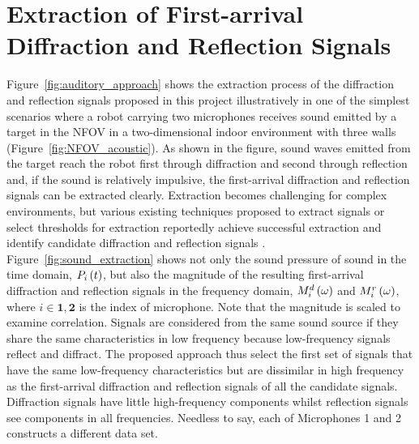 \documentclass[letterpaper, 10 pt, conference]{ieeeconf}  %
\begin{document}
\section{Extraction of First-arrival Diffraction and Reflection Signals} 
Figure~\ref{fig:auditory_approach} shows the extraction process of the diffraction and reflection signals proposed in this project illustratively in one of the simplest scenarios where a robot carrying two microphones receives sound emitted by a target in the NFOV in a two-dimensional indoor environment with three walls (Figure~\ref{fig:NFOV_acoustic}).  As shown in the figure, sound waves emitted from the target reach the robot first through diffraction and second through reflection and, if the sound is relatively impulsive, the first-arrival diffraction and reflection signals can be extracted clearly.  Extraction becomes challenging for complex environments, but various existing techniques proposed to extract signals or select thresholds for extraction reportedly achieve successful extraction and identify candidate diffraction and reflection signals \cite{lee2006large,irahhauten2006investigation,xu2008delay,Guvenc2009}.  Figure~\ref{fig:sound_extraction} shows not only the sound pressure of sound in the time domain, $P_i\left ( t \right )$, but also the magnitude of the resulting first-arrival diffraction and reflection signals in the frequency domain, $M_i^d\left ( \omega \right )$ and $M_i^r\left ( \omega \right )$, where $i \in \bm{1,2}$ is the index of microphone.  Note that the magnitude is scaled to examine correlation.  Signals are considered from the same sound source if they share the same characteristics in low frequency because low-frequency signals reflect and diffract.  The proposed approach thus select the first set of signals that have the same low-frequency characteristics but are dissimilar in high frequency as the first-arrival diffraction and reflection signals of all the candidate signals.  Diffraction signals have little high-frequency components whilst reflection signals see components in all frequencies.  Needless to say, each of Microphones 1 and 2 constructs a different data set.  
\end{document}
